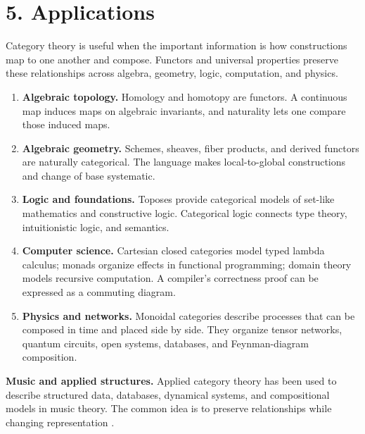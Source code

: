 \section*{5. Applications}
Category theory is useful when the important information is how constructions map to one another and compose. Functors and universal properties preserve these relationships across algebra, geometry, logic, computation, and physics.
\begin{enumerate}[leftmargin=*,itemsep=0.35em]
\item \textbf{Algebraic topology.} Homology and homotopy are functors. A continuous map induces maps on algebraic invariants, and naturality lets one compare those induced maps.
\item \textbf{Algebraic geometry.} Schemes, sheaves, fiber products, and derived functors are naturally categorical. The language makes local-to-global constructions and change of base systematic.
\item \textbf{Logic and foundations.} Toposes provide categorical models of set-like mathematics and constructive logic. Categorical logic connects type theory, intuitionistic logic, and semantics.
\item \textbf{Computer science.} Cartesian closed categories model typed lambda calculus; monads organize effects in functional programming; domain theory models recursive computation. A compiler's correctness proof can be expressed as a commuting diagram.
\item \textbf{Physics and networks.} Monoidal categories describe processes that can be composed in time and placed side by side. They organize tensor networks, quantum circuits, open systems, databases, and Feynman-diagram composition.
\end{enumerate}

\textbf{Music and applied structures.} Applied category theory has been used to describe structured data, databases, dynamical systems, and compositional models in music theory. The common idea is to preserve relationships while changing representation \cite{category_theory_ref3,category_theory_ref4}.


